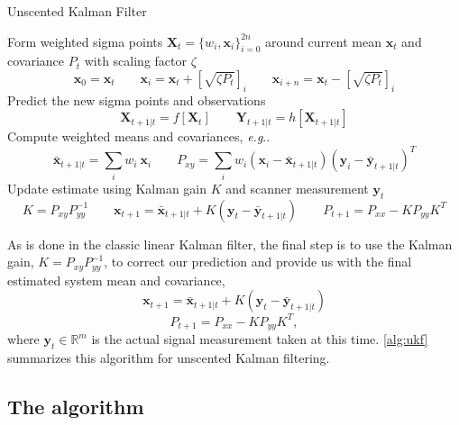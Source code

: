 \documentclass[letterpaper,hyperref,12pt]{gatech-thesis}
\makeatletter
\renewcommand{\v}[1]{\ensuremath{\mathbf #1}\xspace}
\DeclareRobustCommand\onedot{\futurelet\@let@token\@onedot}
\def\@onedot{\ifx\@let@token.\else.\null\fi\xspace}
\newcommand{\eg}{\textit{e.g}\onedot}
\newcommand{\R}{\ensuremath{\mathbb R}}
\newcommand{\x}{\v x}
\newcommand{\y}{\v y}
\newcommand{\X}{\v X}
\newcommand{\Y}{\v Y}
\makeatother
\begin{document}
\begin{algorithm}[t]
  \setlength\abovedisplayskip{2pt}
  \setlength\belowdisplayskip{2pt}
  \caption{Unscented Kalman Filter}
  \label{alg:ukf}
  \begin{algorithmic}[1]
    \STATE Form weighted sigma points $\X_t=\{w_i, \x_i\}_{i=0}^{2n}$ around
    current mean $\x_t$ and covariance $P_t$ with scaling factor $\zeta$
    \begin{equation*}
      \x_0 = \x_t
      \qquad
      \x_i    = \x_t + [\sqrt{\zeta P_t}]_i
      \qquad
      \x_{i+n} = \x_t - [\sqrt{\zeta P_t}]_i
    \end{equation*}
    \STATE Predict the new sigma points and observations
    \begin{equation*}
      \X_{t+1|t} = f[\X_t]   \qquad   \Y_{t+1|t} = h[\X_{t+1|t}]
    \end{equation*}
    \STATE Compute weighted means and covariances, \eg
    \begin{equation*}
      \bar{\x}_{t+1|t} = \sum_i w_i ~ \x_i
      \qquad
      P_{xy} = \sum_i w_i (\x_i - \bar{\x}_{t+1|t})(\y_i - \bar{\y}_{t+1|t})^T
    \end{equation*}
    \STATE Update estimate using Kalman gain $K$ and scanner measurement
    $\y_t$
    \begin{equation*}
      K = P_{xy}P_{yy}^{-1}
      \qquad
      \x_{t+1} = \bar{\x}_{t+1|t} + K(\y_t - \bar{\y}_{t+1|t})
      \qquad
      P_{t+1} = P_{xx} - K P_{yy} K^T
    \end{equation*}
  \end{algorithmic}
\end{algorithm}
As is done in the classic linear Kalman filter, the final step is to use the
Kalman gain, $K = P_{xy}P_{yy}^{-1}$, to correct our prediction and provide us
with the final estimated system mean and covariance,
\begin{equation} \label{eq:x_}
  \x_{t+1} = \bar{\x}_{t+1|t} + K(\y_t - \bar{\y}_{t+1|t})
\end{equation}
\begin{equation} \label{eq:P_}
  P_{t+1} = P_{xx} - K P_{yy} K^T ,
\end{equation}
where $\y_t \in \R^m$ is the actual signal measurement taken at this time.
\autoref{alg:ukf} summarizes this algorithm for unscented Kalman filtering.



\subsection{The algorithm} \label{sec:alg}
\end{document}
